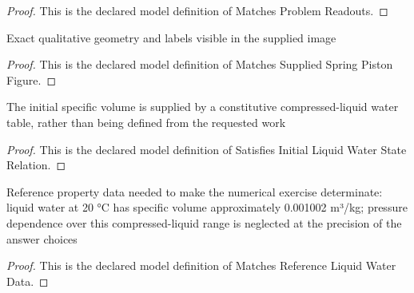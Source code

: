 \begin{proof}
  This is the declared model definition of Matches Problem Readouts.
\end{proof}
\begin{definition}
  \label{def:physics:phyx-mini-0450:phyxminiproblems-problemphyxmini0450-matchessuppliedspringpistonfigure}
  Exact qualitative geometry and labels visible in the supplied image
\end{definition}
\begin{proof}
  This is the declared model definition of Matches Supplied Spring Piston Figure.
\end{proof}
\begin{definition}
  \label{def:physics:phyx-mini-0450:phyxminiproblems-problemphyxmini0450-satisfiesinitialliquidwaterstaterelation}
  The initial specific volume is supplied by a constitutive compressed-liquid water table, rather than being defined from the requested work
\end{definition}
\begin{proof}
  This is the declared model definition of Satisfies Initial Liquid Water State Relation.
\end{proof}
\begin{definition}
  \label{def:physics:phyx-mini-0450:phyxminiproblems-problemphyxmini0450-matchesreferenceliquidwaterdata}
  Reference property data needed to make the numerical exercise determinate: liquid water at 20 °C has specific volume approximately 0.001002 m³/kg; pressure dependence over this compressed-liquid range is neglected at the precision of the answer choices
\end{definition}
\begin{proof}
  This is the declared model definition of Matches Reference Liquid Water Data.
\end{proof}
